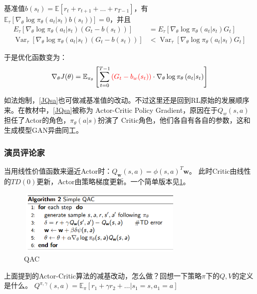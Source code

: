 \documentclass[UTF8]{ctexart}
\begin{document}
基准值$b(s_t) = \mathbb{E}[r_t + r_{t+1} + \ldots + r_{T-1}]$，有
$\mathbb{E}_{\tau}[\nabla_{\theta}\log\pi_{\theta}(a_{t}|s_t)b(s_t))]=0$，并且
\begin{equation}\begin{aligned}
    E_{\tau}\left[\nabla_{\theta} \log \pi_{\theta}\left(a_{t} | s_{t}\right)\left(G_{t}-b\left(s_{t}\right)\right)\right] &=E_{\tau}\left[\nabla_{\theta} \log \pi_{\theta}\left(a_{t} | s_{t}\right) G_{t}\right] \\
    \operatorname{Var}_{\tau}\left[\nabla_{\theta} \log \pi_{\theta}\left(a_{t} | s_{t}\right)\left(G_{t}-b\left(s_{t}\right)\right)\right] &<\operatorname{Var}_{\tau}\left[\nabla_{\theta} \log \pi_{\theta}\left(a_{t} | s_{t}\right) G_{t}\right]
    \end{aligned}
\end{equation}

于是优化函数变为：
\begin{equation} \label{JGt} \nabla_{\theta} J(\theta)=\mathbb{E}_{\pi_{\theta}}\left[\sum_{t=0}^{T-1} {\color{red} (G_{t} - b_{w}(s_t))}
\cdot \nabla_{\theta} \log \pi_{\theta}\left(a_{t} | s_{t}\right)\right]\end{equation}

如法炮制，\eqref{JQsa}也可做减基准值的改动。不过这里还是回到RL原始的发展顺序来。在教材中，\eqref{JQsa}被称为
Actor-Critic Policy Gradient，原因在于$Q_{w}(s, a)$担任了Actor的角色，$\pi_{\theta}(a|s)$扮演了
Critic角色，他们各自有各自的参数，这和生成模型GAN异曲同工。

\subsubsection{演员评论家}
当用线性价值函数来逼近Actor时：$Q_{\mathbf{w}}(s,a)=\phi(s, a)^{T}\mathbf{w}$。
此时Critic由线性的$TD(0)$更新，Actor由策略梯度更新。一个简单版本见\ref{QAC}。

\begin{figure}[htbp]
	\centering
	\includegraphics[width=8cm, height=3.1cm]{./pic/QAC.png}
    \caption{QAC}
    \label{QAC}
\end{figure}

上面提到的Actor-Critic算法的减基改动，怎么做？回想一下策略$\pi$下的$Q,V$的定义是什么。
$Q^{\pi, \gamma}(s, a)=\mathbb{E}_{\pi}\left[r_{1}+\gamma r_{2}+\ldots | s_{1}=s, a_{1}=a\right]$
\end{document}
